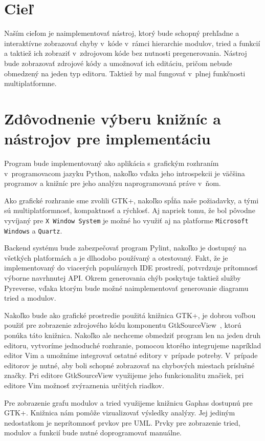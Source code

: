 \documentclass[11pt,oneside,final]{fithesis2}
\begin{document}
	\section{Cieľ}
	
	Naším cieľom je naimplementovať nástroj, ktorý bude schopný prehľadne a interaktívne zobrazovať chyby v~kóde v~rámci hierarchie modulov, tried a funkcií a taktiež ich zobraziť v~zdrojovom kóde bez nutnosti pregenerovania. Nástroj bude zobrazovať zdrojové kódy a umožnovať ich editáciu, pričom nebude obmedzený na jeden typ editoru. Taktiež by mal fungovať v~plnej funkčnosti multiplatformne.
	
	\section{Zdôvodnenie výberu knižníc a nástrojov pre implementáciu}
		Program bude implementovaný ako aplikácia s~grafickým rozhraním v~programovacom jazyku Python, nakoľko vďaka jeho introspekcii je väčšina programov a knižníc pre jeho analýzu naprogramovaná práve v~ňom.
		
		Ako grafické rozhranie sme zvolili GTK+, nakoľko spĺňa naše požiadavky, a tými sú multiplatformnosť, kompaktnosť a rýchlosť. Aj napriek tomu, že bol pôvodne vyvíjaný pre \texttt{X Window System} je možné ho využiť aj na platforme \texttt{Microsoft Windows} a \texttt{Quartz}.
		
		Backend systému bude zabezpečovať program Pylint, nakoľko je dostupný na všetkých platformách a je dlhodobo používaný a otestovaný. Fakt, že je implementovaný do viacerých populárnych IDE prostredí, potvrdzuje prítomnosť výborne navrhnutej API. Okrem generovania chýb poskytuje taktiež služby Pyreverse, vďaka ktorým bude možné naimplementovať generovanie diagramu tried a modulov.
		
		Nakoľko bude ako grafické prostredie použitá knižnica GTK+, je dobrou voľbou použiť pre zobrazenie zdrojového kódu komponentu GtkSourceView~\cite{gtksourceview}, ktorú ponúka táto knižnica. Nakoľko ale nechceme obmedziť program len na jeden druh editoru, vytvoríme jednoduché rozhranie, pomocou ktorého integrujeme napríklad editor Vim a umožníme integrovať ostatné editory v~prípade potreby. V~prípade editorov je nutné, aby boli schopné zobrazovať na chybových miestach príslušné značky. Pri editore GtkSourceView využijeme jeho funkcionalitu značiek, pri editore Vim možnosť zvýraznenia určitých riadkov.
		
		Pre zobrazenie grafu modulov a tried využijeme knižnicu Gaphas dostupnú pre GTK+. Knižnica nám pomôže vizualizovať výsledky analýzy. Jej jediným nedostatkom je neprítomnosť prvkov pre UML. Prvky pre zobrazenie tried, modulov a funkcií bude nutné doprogramovať manuálne.
\end{document}
